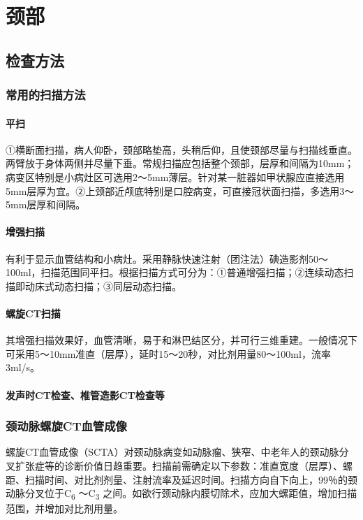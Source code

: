 \chapter{颈部}

\section{检查方法}

\subsection{常用的扫描方法}

\subsubsection{平扫}

①横断面扫描，病人仰卧，颈部略垫高，头稍后仰，且使颈部尽量与扫描线垂直。两臂放于身体两侧并尽量下垂。常规扫描应包括整个颈部，层厚和间隔为10mm；病变区特别是小病灶区可选用2～5mm薄层。针对某一脏器如甲状腺应直接选用5mm层厚为宜。②上颈部近颅底特别是口腔病变，可直接冠状面扫描，多选用3～5mm层厚和间隔。

\subsubsection{增强扫描}

有利于显示血管结构和小病灶。采用静脉快速注射（团注法）碘造影剂50～100ml，扫描范围同平扫。根据扫描方式可分为：①普通增强扫描；②连续动态扫描即动床式动态扫描；③同层动态扫描。

\subsubsection{螺旋CT扫描}

其增强扫描效果好，血管清晰，易于和淋巴结区分，并可行三维重建。一般情况下可采用5～10mm准直（层厚），延时15～20秒，对比剂用量80～100ml，流率3ml/s。

\subsubsection{发声时CT检查、椎管造影CT检查等}

\subsection{颈动脉螺旋CT血管成像}

螺旋CT血管成像（SCTA）对颈动脉病变如动脉瘤、狭窄、中老年人的颈动脉分叉扩张症等的诊断价值日趋重要。扫描前需确定以下参数：准直宽度（层厚）、螺距、扫描时间、对比剂剂量、注射流率及延迟时间。扫描方向自下向上，99％的颈动脉分叉位于C\textsubscript{6}
～C\textsubscript{3}
之间。如欲行颈动脉内膜切除术，应加大螺距值，增加扫描范围，并增加对比剂用量。

